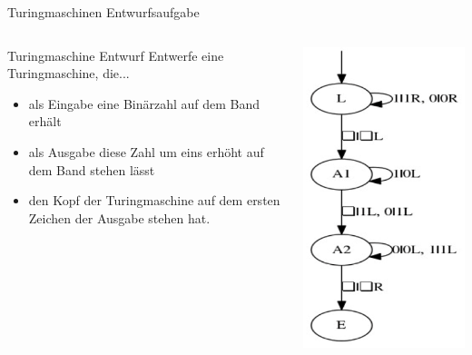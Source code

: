 \documentclass{beamer}
\begin{document}
\begin{frame}{Turingmaschinen Entwurfsaufgabe}
	
	\begin{columns}
		\begin{column}{0.65\textwidth}
			\begin{taskblock}{Turingmaschine Entwurf}
				Entwerfe eine Turingmaschine, die...
				\begin{itemize}
					\item als Eingabe eine Binärzahl auf dem Band erhält
					\item als Ausgabe diese Zahl um eins erhöht auf dem Band stehen lässt
					\item den Kopf der Turingmaschine auf dem ersten Zeichen der Ausgabe stehen hat.
				\end{itemize}
			\end{taskblock}
		\end{column}
		
		\begin{column}{0.45\textwidth}
			\pause
			
			\includegraphics[scale=0.5]{images/turingmaschine_plusone.png}
		\end{column}
	\end{columns}
	
\end{frame}
\end{document}
